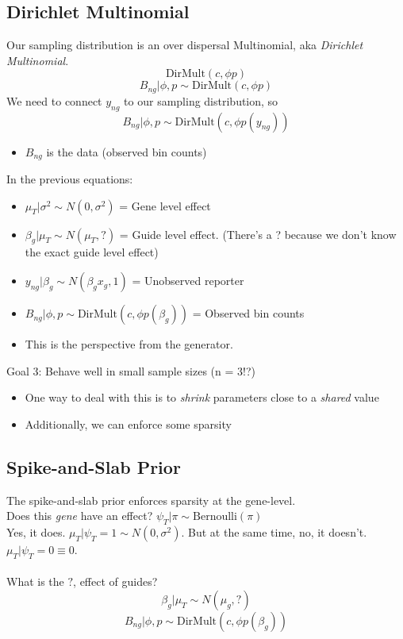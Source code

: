 \documentclass[10pt]{article}
\begin{document}
\subsection*{Dirichlet Multinomial}
Our sampling distribution is an over dispersal Multinomial, aka \textit{Dirichlet Multinomial}.
\[\text{DirMult}(c, \phi p)\]
\[B_{ng} \vert \phi, p \sim \text{DirMult}(c, \phi p)\]
We need to connect $y_{ng}$ to our sampling distribution, so
\[B_{ng} \vert \phi, p \sim \text{DirMult}(c, \phi p(y_{ng}))\]
\begin{itemize}
    \item $B_{ng}$ is the data (observed bin counts)
\end{itemize}
In the previous equations:
\begin{itemize}
    \item $\mu_T \vert \sigma^2 \sim N(0, \sigma^2)$ = Gene level effect
    \item $\beta_g \vert \mu_T \sim N(\mu_T, ?)$ = Guide level effect.  (There's a ? because we don't know the exact guide level effect)
    \item $y_{ng} \vert \beta_g \sim N(\beta_g x_g, 1)$ = Unobserved reporter
    \item $B_{ng} \vert \phi, p \sim \text{DirMult}(c, \phi p(\beta_g))$ = Observed bin counts
    \item This is the perspective from the generator.
\end{itemize}
Goal 3: Behave well in small sample sizes (n = 3!?)
\begin{itemize}
    \item One way to deal with this is to \textit{shrink} parameters close to a \textit{shared} value
    \item Additionally, we can enforce some sparsity
\end{itemize}

\subsection*{Spike-and-Slab Prior}
The spike-and-slab prior enforces sparsity at the gene-level.\\
Does this \textit{gene} have an effect?  $\psi_T \vert \pi \sim \text{Bernoulli}(\pi)$\\
Yes, it does.  $\mu_T \vert \psi_T = 1 \sim N(0, \sigma^2)$.  But at the same time, no, it doesn't.  $\mu_T \vert \psi_T = 0 \equiv 0$.\\\\
What is the $?$, effect of guides?
\[\beta_g \vert \mu_T \sim N(\mu_g, ?)\]
\[B_{ng} \vert \phi, p \sim \text{DirMult}(c, \phi p(\beta_g))\]
\end{document}
